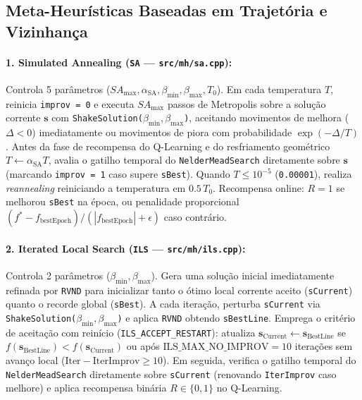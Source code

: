\documentclass[11pt,a4paper]{article}
\begin{document}
\subsection{Meta-Heurísticas Baseadas em Trajetória e Vizinhança}

\paragraph{1. Simulated Annealing (\texttt{SA} --- \texttt{src/mh/sa.cpp}):}
Controla 5 parâmetros ($SA_{\max}, \alpha_{\text{SA}}, \beta_{\min}, \beta_{\max}, T_0$). Em cada temperatura $T$, reinicia \texttt{improv = 0} e executa $SA_{\max}$ passos de Metropolis sobre a solução corrente $\mathbf{s}$ com \texttt{ShakeSolution($\beta_{\min}, \beta_{\max}$)}, aceitando movimentos de melhora ($\Delta < 0$) imediatamente ou movimentos de piora com probabilidade $\exp(-\Delta/T)$. Antes da fase de recompensa do Q-Learning e do resfriamento geométrico $T \leftarrow \alpha_{\text{SA}} T$, avalia o gatilho temporal do \texttt{NelderMeadSearch} diretamente sobre $\mathbf{s}$ (marcando \texttt{improv = 1} caso supere \texttt{sBest}). Quando $T \le 10^{-5}$ (\texttt{0.00001}), realiza \emph{reannealing} reiniciando a temperatura em $0.5\,T_0$. Recompensa online: $R=1$ se melhorou \texttt{sBest} na época, ou penalidade proporcional $(f^* - f_{\text{bestEpoch}})/(|f_{\text{bestEpoch}}| + \epsilon)$ caso contrário.

\paragraph{2. Iterated Local Search (\texttt{ILS} --- \texttt{src/mh/ils.cpp}):}
Controla 2 parâmetros ($\beta_{\min}, \beta_{\max}$). Gera uma solução inicial imediatamente refinada por \texttt{RVND} para inicializar tanto o ótimo local corrente aceito (\texttt{sCurrent}) quanto o recorde global (\texttt{sBest}). A cada iteração, perturba \texttt{sCurrent} via \texttt{ShakeSolution($\beta_{\min}, \beta_{\max}$)} e aplica \texttt{RVND} obtendo \texttt{sBestLine}. Emprega o critério de aceitação com reinício (\texttt{ILS\_ACCEPT\_RESTART}): atualiza $\mathbf{s}_{\text{Current}} \leftarrow \mathbf{s}_{\text{BestLine}}$ se $f(\mathbf{s}_{\text{BestLine}}) < f(\mathbf{s}_{\text{Current}})$ ou após $\text{ILS\_MAX\_NO\_IMPROV} = 10$ iterações sem avanço local ($\text{Iter} - \text{IterImprov} \ge 10$). Em seguida, verifica o gatilho temporal do \texttt{NelderMeadSearch} diretamente sobre \texttt{sCurrent} (renovando \texttt{IterImprov} caso melhore) e aplica recompensa binária $R \in \{0, 1\}$ no Q-Learning.
\end{document}
